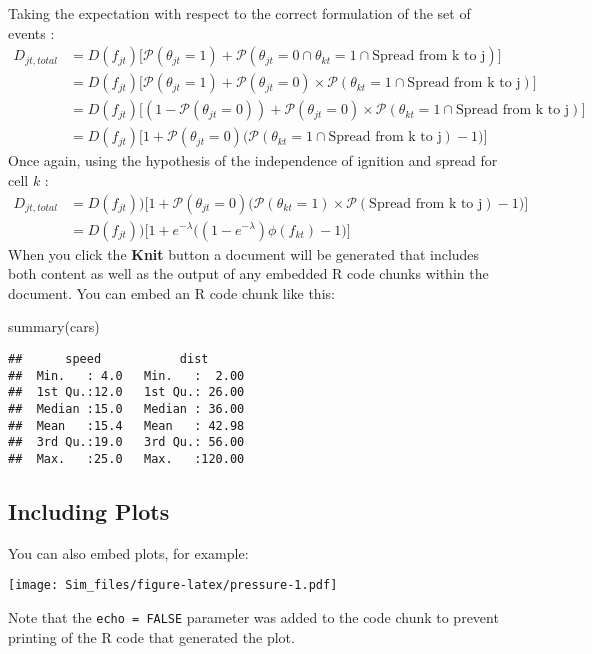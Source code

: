 \documentclass[
]{article}
\newenvironment{Shaded}{\begin{snugshade}}{\end{snugshade}}
\newcommand{\FunctionTok}[1]{\textcolor[rgb]{0.00,0.00,0.00}{#1}}
\newcommand{\NormalTok}[1]{#1}
\begin{document}
Taking the expectation with respect to the correct formulation of the
set of events : \begin{align*}
    D_{jt,total}&=D(f_{jt})\big[ \mathcal{P}(\theta_{jt}=1)+\mathcal{P}(\theta_{jt}=0\cap \theta_{kt}=1\cap \text{Spread from k to j})\big]\\
    &=D(f_{jt})\big[ \mathcal{P}(\theta_{jt}=1)+\mathcal{P}(\theta_{jt}=0)\times \mathcal{P}( \theta_{kt}=1\cap \text{Spread from k to j})\big]\\
    &=D(f_{jt})\big[ (1-\mathcal{P}(\theta_{jt}=0))+\mathcal{P}(\theta_{jt}=0)\times \mathcal{P}( \theta_{kt}=1\cap \text{Spread from k to j})\big]\\
    &= D(f_{jt})\big[ 1+ \mathcal{P}(\theta_{jt}=0)\big(\mathcal{P}( \theta_{kt}=1\cap \text{Spread from k to j})-1\big)\big]
\end{align*} Once again, using the hypothesis of the independence of
ignition and spread for cell \(k\) : \begin{align*}
     D_{jt,total}&=D(f_{jt}))\big[ 1+ \mathcal{P}(\theta_{jt}=0)\big(\mathcal{P}( \theta_{kt}=1)\times \mathcal{P}( \text{Spread from k to j})-1\big)\big]\\
     &=D(f_{jt}))\big[ 1+ e^{-\lambda}\big((1-e^{-\lambda})\phi(f_{kt})-1\big)\big]
\end{align*} When you click the \textbf{Knit} button a document will be
generated that includes both content as well as the output of any
embedded R code chunks within the document. You can embed an R code
chunk like this:

\begin{Shaded}
\begin{Highlighting}[]
\FunctionTok{summary}\NormalTok{(cars)}
\end{Highlighting}
\end{Shaded}

\begin{verbatim}
##      speed           dist       
##  Min.   : 4.0   Min.   :  2.00  
##  1st Qu.:12.0   1st Qu.: 26.00  
##  Median :15.0   Median : 36.00  
##  Mean   :15.4   Mean   : 42.98  
##  3rd Qu.:19.0   3rd Qu.: 56.00  
##  Max.   :25.0   Max.   :120.00
\end{verbatim}

\hypertarget{including-plots}{%
\subsection{Including Plots}\label{including-plots}}

You can also embed plots, for example:

\texttt{[image: Sim\_files/figure-latex/pressure-1.pdf]}

Note that the \texttt{echo\ =\ FALSE} parameter was added to the code
chunk to prevent printing of the R code that generated the plot.
\end{document}
